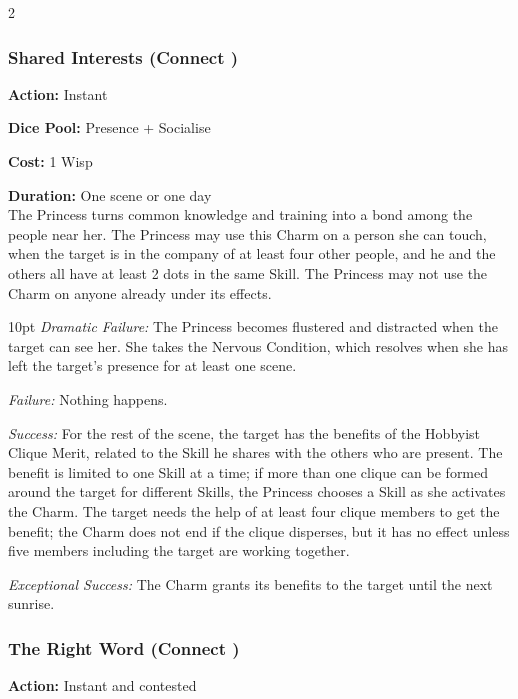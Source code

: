 \begin{multicols}{2}
\subsubsection*{Shared Interests (Connect \textbullet\textbullet)}

\noindent \textbf{Action:} Instant

\noindent \textbf{Dice Pool:}  Presence + Socialise 

\noindent \textbf{Cost:} 1 Wisp

\noindent \textbf{Duration:} One scene or one day \\

\noindent The Princess turns common knowledge and training into a bond among the people near her. The Princess may use this Charm on a person she can touch, when the target is in the company of at least four other people, and he and the others all have at least 2 dots in the same Skill. The Princess may not use the Charm on anyone already under its effects.

\begin{myindentpar}{10pt}
    \emph{Dramatic Failure:} The Princess becomes flustered and distracted when the target can see her. She takes the Nervous Condition, which resolves when she has left the target’s presence for at least one scene.
    
    \emph{Failure:} Nothing happens. 
    
    \emph{Success:} For the rest of the scene, the target has the benefits of the Hobbyist Clique Merit, related to the Skill he shares with the others who are present. The benefit
is limited to one Skill at a time; if more than one clique can be formed around the target for different Skills, the Princess chooses a Skill as she activates the Charm. The target needs the help of at least four clique members to get the benefit; the Charm does not end if the clique disperses, but it has no effect unless five members including the target are working together.
    
    \emph{Exceptional Success:} The Charm grants its benefits to the target until the next sunrise.
\end{myindentpar}

\subsubsection*{The Right Word (Connect \textbullet\textbullet)}

\noindent \textbf{Action:} Instant and contested


\end{multicols}

